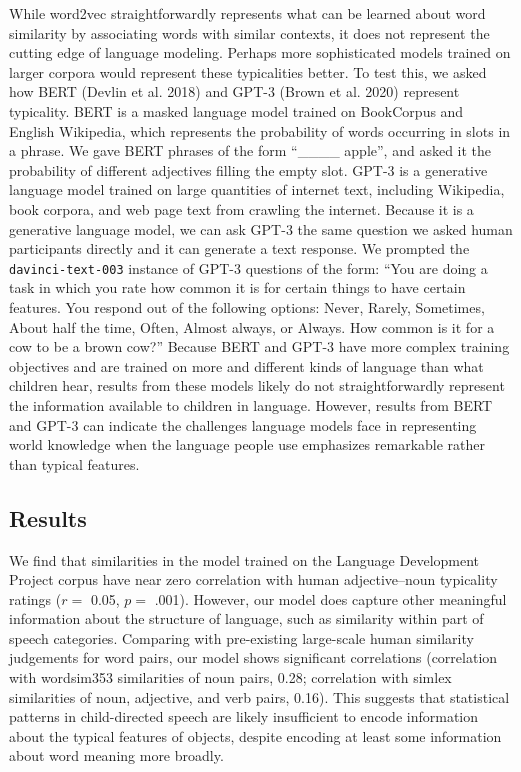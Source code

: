 \documentclass{ucetd}
\begin{document}
While word2vec straightforwardly represents what can be learned about
word similarity by associating words with similar contexts, it does not
represent the cutting edge of language modeling. Perhaps more
sophisticated models trained on larger corpora would represent these
typicalities better. To test this, we asked how BERT (Devlin et al.
2018) and GPT-3 (Brown et al. 2020) represent typicality. BERT is a
masked language model trained on BookCorpus and English Wikipedia, which
represents the probability of words occurring in slots in a phrase. We
gave BERT phrases of the form ``\_\_\_\_ apple'', and asked it the
probability of different adjectives filling the empty slot. GPT-3 is a
generative language model trained on large quantities of internet text,
including Wikipedia, book corpora, and web page text from crawling the
internet. Because it is a generative language model, we can ask GPT-3
the same question we asked human participants directly and it can
generate a text response. We prompted the \texttt{davinci-text-003}
instance of GPT-3 questions of the form: ``You are doing a task in which
you rate how common it is for certain things to have certain features.
You respond out of the following options: Never, Rarely, Sometimes,
About half the time, Often, Almost always, or Always. How common is it
for a cow to be a brown cow?'' Because BERT and GPT-3 have more complex
training objectives and are trained on more and different kinds of
language than what children hear, results from these models likely do
not straightforwardly represent the information available to children in
language. However, results from BERT and GPT-3 can indicate the
challenges language models face in representing world knowledge when the
language people use emphasizes remarkable rather than typical features.

\hypertarget{results-1}{%
\subsection{Results}\label{results-1}}

We find that similarities in the model trained on the Language
Development Project corpus have near zero correlation with human
adjective--noun typicality ratings (\(r =\) 0.05, \(p =\) .001).
However, our model does capture other meaningful information about the
structure of language, such as similarity within part of speech
categories. Comparing with pre-existing large-scale human similarity
judgements for word pairs, our model shows significant correlations
(correlation with wordsim353 similarities of noun pairs, 0.28;
correlation with simlex similarities of noun, adjective, and verb pairs,
0.16). This suggests that statistical patterns in child-directed speech
are likely insufficient to encode information about the typical features
of objects, despite encoding at least some information about word
meaning more broadly.
\end{document}
